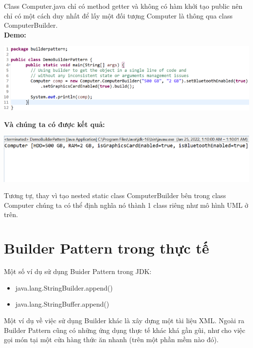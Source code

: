 Class Computer.java chỉ có method getter và không có hàm khởi tạo public nên chỉ có một cách duy nhất để lấy một đối tượng Computer là thông qua class ComputerBuilder.\\
\newpage
\textbf{Demo:}
\begin{center}
\includegraphics{GALLEYS/images/chapter10/code4}
\end{center}
\textbf{Và chúng ta có được kết quả:}
\begin{center}
\includegraphics{GALLEYS/images/chapter10/code5}
\end{center}
Tương tự, thay vì tạo nested static class ComputerBuilder bên trong class Computer chúng ta có thể định nghĩa nó thành 1 class riêng như mô hình UML ở trên.

\section{Builder Pattern trong thực tế}
Một số ví dụ sử dụng Buider Pattern trong JDK:
\begin{itemize}
\item java.lang.StringBuilder.append()
\item java.lang.StringBuffer.append()
\end{itemize}
Một ví dụ về việc sử dụng Builder khác là xây dựng một tài liệu XML. Ngoài ra Builder Pattern cũng có những ứng dụng thực tế khác khá gần gũi, như cho việc gọi món tại một cửa hàng thức ăn nhanh (trên một phần mềm nào đó).